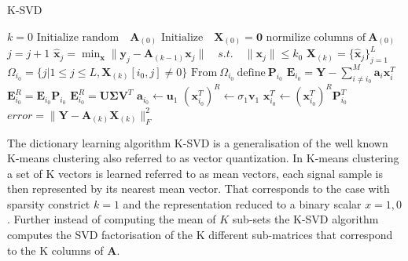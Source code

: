 \begin{algorithm}[H]
\caption{K-SVD}
\begin{algorithmic}[1]
			\State$k = 0$			
			\State$\text{Initialize random} \quad  \textbf{A}_{(0)}$            
			\State$\text{Initialize} \quad \textbf{X}_{(0)}=\mathbf{0}$
			\State
            \State$\text{normilize columns of} \ \textbf{A}_{(0)}$
                \State $j = j+1$
                 
                	\State$\hat{\textbf{x}}_{j} = \min_{\textbf{x}} \|\textbf{y}_j -\textbf{A}_{(k-1)}\textbf{x}_{j}\| \quad s.t. \quad \|\textbf{x}_{j}\| \leq k_0 $
				\EndFor
				\State$\textbf{X}_{(k)}=\{\hat{\textbf{x}}_{j}\}_{j=1}^{L}$
					\State$\Omega_{i_0}=\{j|1\leq j \leq L , \textbf{X}_{(k)}[i_0,j]\neq 0\}$
					\State$\text{From} \ \Omega_{i_0} \ \text{define} \ \textbf{P}_{i_0} $
					\State$\textbf{E}_{i_0} =  \textbf{Y}- \sum_{i\neq i_{0}}^{M} \textbf{a}_i\textbf{x}_i^{T}$
					\State$\textbf{E}_{i_0}^R = \textbf{E}_{i_0}\textbf{P}_{i_0}$
					\State$\textbf{E}_{i_0}^R=\textbf{U}\boldsymbol{\Sigma}\textbf{V}^T$ 
					\State$\textbf{a}_{i_0}\gets \textbf{u}_{1}$ 
					\State$\left( \textbf{x}_{i_0}^T\right)^R \gets \sigma_{1}\textbf{v}_{1}$
					\State$\textbf{x}_{i_0}^T \gets \left( \textbf{x}_{i_0}^T\right)^R \textbf{P}_{i_0}^T $ 
				\EndFor
				\State$error =\| \textbf{Y}-\textbf{A}_{(k)}\textbf{X}_{(k)}\|_{F}^2 $
          		\EndWhile
            \EndProcedure
        \end{algorithmic} 
        \label{alg:K_SVD}
\end{algorithm}

The dictionary learning algorithm K-SVD is a generalisation of the well known K-means clustering also referred to as vector quantization. In K-means clustering a set of K vectors is learned referred to as mean vectors, each signal sample is then represented by its nearest mean vector. That corresponds to the case with sparsity constrict $k=1$ and the representation reduced to a binary scalar $x={1,0}$. Further instead of computing the mean of $K$ sub-sets the K-SVD algorithm computes the SVD factorisation of the K different sub-matrices that correspond to the K columns of $\textbf{A}$.\\
